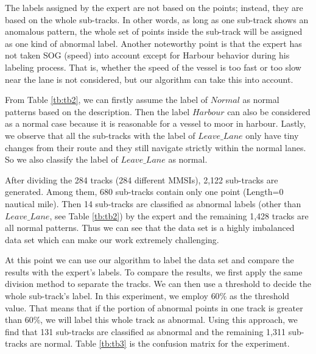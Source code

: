 \documentclass[12pt,glossary]{dalcsthesis}
\begin{document}
The labels assigned by the expert are not based on the points; instead, they are based on the whole sub-tracks. In other words, as long as one sub-track shows an anomalous pattern, the whole set of points inside the sub-track will be assigned as one kind of abnormal label. Another noteworthy point is that the expert has not taken SOG (speed) into account except for Harbour behavior during his labeling process. That is, whether the speed of the vessel is too fast or too slow near the lane is not considered, but our algorithm can take this into account.

From Table \ref{tb:tb2}, we can firstly assume the label of $Normal$ as normal patterns based on the description. Then the label $Harbour$ can also be considered as a normal case because it is reasonable for a vessel to moor in harbour. Lastly, we observe that all the sub-tracks with the label of $Leave\_Lane$ only have tiny changes from their route and they still navigate strictly within the normal lanes. So we also classify the label of  $Leave\_Lane$ as normal.

After dividing the 284 tracks (284 different MMSIs), 2,122 sub-tracks are generated. Among them, 680 sub-tracks contain only one point (Length=0 nautical mile). Then 14 sub-tracks are classified as abnormal labels (other than $Leave\_Lane$, see Table \ref{tb:tb2}) by the expert and the remaining 1,428 tracks are all normal patterns. Thus we can see that the data set is a highly imbalanced data set which can make our work extremely challenging. 





At this point we can use our algorithm to label the data set and compare the results with the expert's labels. To compare the results, we first apply the same division method to separate the tracks. We can then use a threshold to decide the whole sub-track's label. In this experiment, we employ $60\%$ as the threshold value. That means that if the portion of abnormal points in one track is greater than $60\%$, we will label this whole track as abnormal. Using this approach, we find that 131 sub-tracks are classified as abnormal and the remaining 1,311 sub-tracks are normal. Table \ref{tb:tb3} is the confusion matrix for the experiment.
\end{document}
